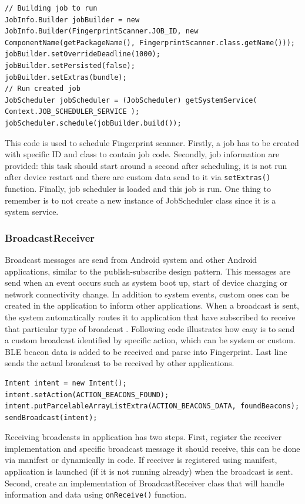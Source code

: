 \begin{lstlisting}[caption=Schedule Firngerprint scanner job.]
// Building job to run
JobInfo.Builder jobBuilder = new JobInfo.Builder(FingerprintScanner.JOB_ID, new ComponentName(getPackageName(), FingerprintScanner.class.getName()));
jobBuilder.setOverrideDeadline(1000);
jobBuilder.setPersisted(false);
jobBuilder.setExtras(bundle);
// Run created job
JobScheduler jobScheduler = (JobScheduler) getSystemService( Context.JOB_SCHEDULER_SERVICE );
jobScheduler.schedule(jobBuilder.build());
\end{lstlisting}

This code is used to schedule Fingerprint scanner. Firstly, a job has to be created with specific ID and class to contain job code. Secondly, job information are provided: this task should start around a second after scheduling, it is not run after device restart and there are custom data send to it via \verb|setExtras()| function. Finally, job scheduler is loaded and this job is run. One thing to remember is to not create a new instance of JobScheduler class since it is a system service.

\subsubsection{BroadcastReceiver}\label{subsubsec:BroadcastReceiver}
Broadcast messages are send from Android system and other Android applications, similar to the publish-subscribe design pattern. This messages are send when an event occurs such as system boot up, start of device charging or network connectivity change. In addition to system events, custom ones can be created in the application to inform other applications. When a broadcast is sent, the system automatically routes it to application that have subscribed to receive that particular type of broadcast \cite{AD}. Following code illustrates how easy is to send a custom broadcast identified by specific action, which can be system or custom. BLE beacon data is added to be received and parse into Fingerprint. Last line sends the actual broadcast to be received by other applications.

\begin{lstlisting}[caption=Send broadcast with BLE beacons found.]
Intent intent = new Intent();
intent.setAction(ACTION_BEACONS_FOUND);
intent.putParcelableArrayListExtra(ACTION_BEACONS_DATA, foundBeacons);
sendBroadcast(intent);
\end{lstlisting}

Receiving broadcasts in application has two steps. First, register the receiver implementation and specific broadcast message it should receive, this can be done via manifest or dynamically in code. If receiver is registered using manifest, application is launched (if it is not running already) when the broadcast is sent. Second, create an implementation of BroadcastReceiver class that will handle information and data using \verb|onReceive()| function.

